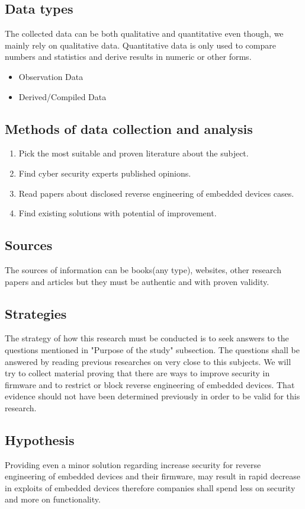 \documentclass[]{report}
\begin{document}
\subsection{Data types}
The collected data can be both qualitative and quantitative even though, we mainly rely on qualitative data.
Quantitative data is only used to compare numbers and statistics and derive results in numeric or other forms.
\begin{itemize}
	\item Observation Data
	\item Derived/Compiled Data
\end{itemize}
\subsection{Methods of data collection and analysis}
\begin{enumerate}
	\item Pick the most suitable and proven literature about the subject.
	\item Find cyber security experts published opinions.
	\item Read papers about disclosed reverse engineering of embedded devices cases.
	\item Find existing solutions with potential of improvement.
\end{enumerate}
\subsection{Sources}
The sources of information can be books(any type), websites, other research papers and articles but they must be authentic and with proven validity.
\subsection{Strategies}
The strategy of how this research must be conducted is to seek answers to the questions mentioned in "Purpose of the study" subsection. The questions shall be answered by reading previous researches on very close to this subjects.
We will try to collect material proving that there are ways to improve security in firmware and to restrict or block reverse engineering of embedded devices. That evidence should not have been determined previously in order to be valid for this research.
\subsection{Hypothesis}
Providing even a minor solution regarding increase security for reverse engineering of embedded devices and their firmware, may result in rapid decrease in exploits of embedded devices therefore companies shall spend less on security and more on functionality.
\end{document}
